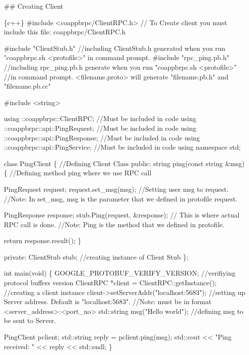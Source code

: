 \#\# Creating Client 
\begin{DoxyCode}
\{c++\}
#include <coappbrpc/ClientRPC.h> // To Create client you must include this file: coappbrpc/ClientRPC.h

#include "ClientStub.h" //including ClientStub.h generated when you run "coappbrpc.sh <protofile>" in
       command prompt.
#include "rpc\_ping.pb.h" //including rpc\_ping.pb.h generate when you run "coappbrpc.sh <protofile>" 
//in command prompt. <filename.proto> will generate "filename.pb.h" and "filename.pb.cc"

#include <string>

using ::coappbrpc::ClientRPC;  //Must be included in code
using ::coappbrpc::api::PingRequest; //Must be included in code
using ::coappbrpc::api::PingResponse; //Must be included in code
using ::coappbrpc::api::PingService; //Must be included in code
using namespace std;

class PingClient \{ //Defining Client Class
public:
  string ping(const string &msg) \{ //Defining method ping where we use RPC call

    PingRequest request;
    request.set\_msg(msg); //Setting user msg to request. 
    //Note: In set\_msg, msg is the parameter that we defined in protofile request.

    PingResponse response;
    stub.Ping(request, &response); // This is where actual RPC call is done.
   //Note: Ping is the method that we defined in protofile.

    return response.result();
  \}

private:
    ClientStub stub; //creating instance of Client Stub
\};

int main(void) \{
  GOOGLE\_PROTOBUF\_VERIFY\_VERSION; //verifiying protocol buffers version
  ClientRPC *client = ClientRPC::getInstance(); //creating a client instance
  client->setServerAddr("localhost:5683"); //setting up Server address. Default is "localhost:5683". 
                                        //Note: must be in format <server\_address>:<port\_no>
  std::string msg("Hello world"); //defining msg to be sent to Server.

  PingClient pclient;
  std::string reply = pclient.ping(msg);
  std::cout << "Ping received: " << reply << std::endl;
\}
\end{DoxyCode}


